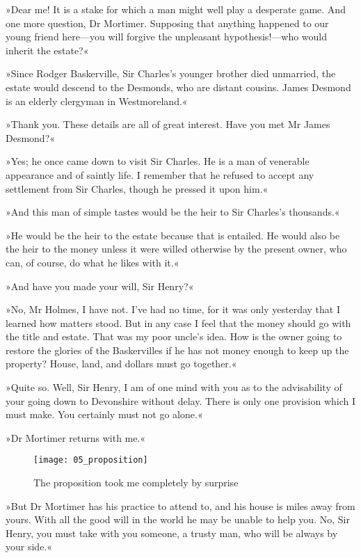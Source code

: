 »Dear me! It is a stake for which a man might well play a desperate game. And one more question, Dr Mortimer. Supposing that anything happened to our young friend here\allowbreak---\allowbreak you will forgive the unpleasant hypothesis!\allowbreak---\allowbreak who would inherit the estate?«

»Since Rodger Baskerville, Sir Charles's younger brother died unmarried, the estate would descend to the Desmonds, who are distant cousins. James Desmond is an elderly clergyman in Westmoreland.«

»Thank you. These details are all of great interest. Have you met Mr James Desmond?«

»Yes; he once came down to visit Sir Charles. He is a man of venerable appearance and of saintly life. I remember that he refused to accept any settlement from Sir Charles, though he pressed it upon him.«

»And this man of simple tastes would be the heir to Sir Charles's thousands.«

»He would be the heir to the estate because that is entailed. He would also be the heir to the money unless it were willed otherwise by the present owner, who can, of course, do what he likes with it.«

»And have you made your will, Sir Henry?«

»No, Mr Holmes, I have not. I've had no time, for it was only yesterday that I learned how matters stood. But in any case I feel that the money should go with the title and estate. That was my poor uncle's idea. How is the owner going to restore the glories of the Baskervilles if he has not money enough to keep up the property? House, land, and dollars must go together.«

»Quite so. Well, Sir Henry, I am of one mind with you as to the advisability of your going down to Devonshire without delay. There is only one provision which I must make. You certainly must not go alone.«

»Dr Mortimer returns with me.«


\begin{figure}[t!h]
\centering
\texttt{[image: 05\_proposition]}
\caption{The proposition took me completely by surprise}
\end{figure}

»But Dr Mortimer has his practice to attend to, and his house is miles away from yours. With all the good will in the world he may be unable to help you. No, Sir Henry, you must take with you someone, a trusty man, who will be always by your side.«

